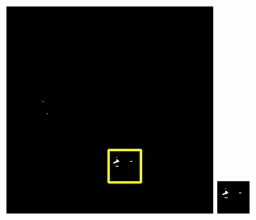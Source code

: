 \documentclass[UTF8]{ctexart}
\begin{document}
\begin{figure}[H]
{\begin{minipage}[b]{0.15\linewidth}
            \includegraphics[width=1\linewidth]{../log/cut/LC80650182013237LGN00_10854_unet.jpg}\vspace{4pt}
            \includegraphics[width=1\linewidth]{../log/cut/tmp_cut_LC80650182013237LGN00_10854_unet.jpg}

\end{minipage}}
\end{figure}
\end{document}
